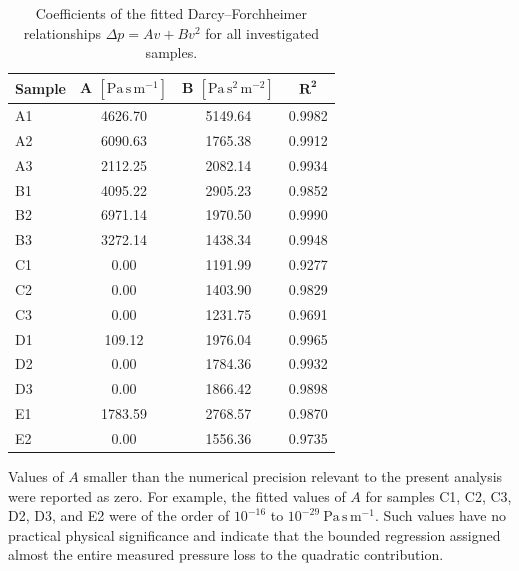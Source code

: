\documentclass[a4paper]{article}
\begin{document}
\begin{table}[htbp]
    \centering
    \caption{Coefficients of the fitted Darcy--Forchheimer relationships
    \(\Delta p = Av + Bv^2\) for all investigated samples.}
    \label{tab:darcy_forchheimer_coefficients}

    \begin{tabular}{lccc}
        \hline
        \textbf{Sample}
        &
        \(\boldsymbol{A}\)
        \([\mathrm{Pa\,s\,m^{-1}}]\)
        &
        \(\boldsymbol{B}\)
        \([\mathrm{Pa\,s^2\,m^{-2}}]\)
        &
        \(\boldsymbol{R^2}\)
        \\
        \hline

        A1 & 4626.70 & 5149.64 & 0.9982 \\
        A2 & 6090.63 & 1765.38 & 0.9912 \\
        A3 & 2112.25 & 2082.14 & 0.9934 \\

        \hline

        B1 & 4095.22 & 2905.23 & 0.9852 \\
        B2 & 6971.14 & 1970.50 & 0.9990 \\
        B3 & 3272.14 & 1438.34 & 0.9948 \\

        \hline

        C1 & 0.00 & 1191.99 & 0.9277 \\
        C2 & 0.00 & 1403.90 & 0.9829 \\
        C3 & 0.00 & 1231.75 & 0.9691 \\

        \hline

        D1 & 109.12 & 1976.04 & 0.9965 \\
        D2 & 0.00 & 1784.36 & 0.9932 \\
        D3 & 0.00 & 1866.42 & 0.9898 \\

        \hline

        E1 & 1783.59 & 2768.57 & 0.9870 \\
        E2 & 0.00 & 1556.36 & 0.9735 \\

        \hline
    \end{tabular}
\end{table}

Values of \(A\) smaller than the numerical precision relevant to the present analysis were reported as zero. For example, the fitted values of \(A\) for samples C1, C2, C3, D2, D3, and E2 were of the order of \(10^{-16}\) to \(10^{-29}~\mathrm{Pa\,s\,m^{-1}}\). Such values have no practical physical significance and indicate that the bounded regression assigned almost the entire measured pressure loss to the quadratic contribution.
\end{document}
